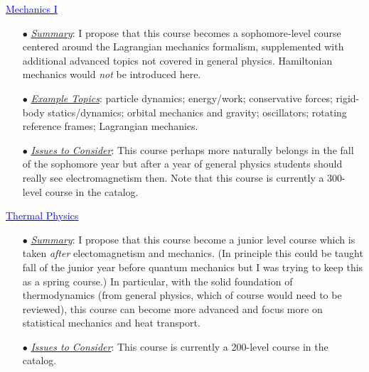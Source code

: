 \documentclass[12pt,preprint]{aastex}
\newcommand{\blue}[1]{\textcolor{blue}{#1}}
\begin{document}
\begin{itemize*}
\item{\underline{\blue{Mechanics I}}
  \begin{itemize}
    \item[$\bullet$]{\underline{\em Summary}: I propose that this course becomes
      a sophomore-level course centered around the Lagrangian mechanics
      formalism, supplemented with additional advanced topics not covered in
      general physics.  Hamiltonian mechanics would \emph{not} be introduced
      here.}
    \item[$\bullet$]{\underline{\em Example Topics}: particle
      dynamics; energy/work; conservative forces; rigid-body statics/dynamics;
      orbital mechanics and gravity; oscillators; rotating reference frames;
      Lagrangian mechanics.}
    \item[$\bullet$]{\underline{\em Issues to Consider}: This course perhaps
      more naturally belongs in the fall of the sophomore year but after a year
      of general physics students should really see electromagnetism then.  Note
      that this course is currently a 300-level course in the catalog.}
  \end{itemize}
}

\item{\underline{\blue{Thermal Physics}}
  \begin{itemize}
  \item[$\bullet$]{\underline{\em Summary}: I propose that this course become a
    junior level course which is taken \emph{after} electomagnetism and
    mechanics.  (In principle this could be taught fall of the junior year
    before quantum mechanics but I was trying to keep this as a spring course.)
    In particular, with the solid foundation of thermodynamics (from general
    physics, which of course would need to be reviewed), this course can become
    more advanced and focus more on statistical mechanics and heat transport.}
    \item[$\bullet$]{\underline{\em Issues to Consider}: This course is
      currently a 200-level course in the catalog.}
  \end{itemize}
}


\end{itemize*}
\end{document}
